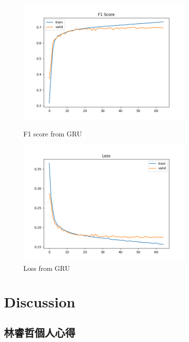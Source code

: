 \documentclass[8pt,a4paper]{article}
\begin{document}
\begin{figure}[H]
    \begin{minipage}[t]{0.5\textwidth}
    \begin{center}
        \includegraphics[width=250pt]{./Figures/F1_score_GRU.png}
        \caption{F1 score from GRU}
        \label{fig:F1_GRU}
    \end{center}    
    \end{minipage}    
    \begin{minipage}[t]{0.5\textwidth}
    \begin{center}
        \includegraphics[width=250pt]{./Figures/Loss_sample_GRU.png}
        \caption{Loss from GRU}
        \label{fig:Loss_GRU}
    \end{center}    
    \end{minipage}
\end{figure}


\section*{Discussion} 
\label{sec:Discussion}

\subsection*{林睿哲個人心得}
\end{document}
